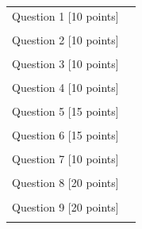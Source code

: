 \documentclass[a4paper,12pt,fleqn]{article}
\begin{document}
\begin{table}[h]
\centering
\begin{tabular}{| m{6cm} | m{6cm} |}
\hline
\vspace{0.5cm}
Question 1 [10 points] & \\
\vspace{0.5cm} &\vspace{0.5cm}\\
\hline
\vspace{0.5cm}
Question 2 [10 points] & \\
\vspace{0.5cm} &\vspace{0.5cm}\\
\hline
\vspace{0.5cm}
Question 3 [10 points] & \\
\vspace{0.5cm} &\vspace{0.5cm}\\
\hline
\vspace{0.5cm}
Question 4 [10 points] &  \\
\vspace{0.5cm} &\vspace{0.5cm}\\
\hline
\vspace{0.5cm}
Question 5 [15 points] & \\
\vspace{0.5cm} &\vspace{0.5cm}\\\hline
\vspace{0.5cm}
Question 6 [15 points] & \\
\vspace{0.5cm} &\vspace{0.5cm}\\\hline
\vspace{0.5cm}
Question 7 [10 points] & \\
\vspace{0.5cm} &\vspace{0.5cm}\\\hline

\vspace{0.5cm}
Question 8 [20 points] & \\
\vspace{0.5cm} &\vspace{0.5cm}\\\hline

\vspace{0.5cm}
Question 9 [20 points] & \\
\vspace{0.5cm} &\vspace{0.5cm}\\\hline



\hline
\end{tabular}
\end{table}
\end{document}
